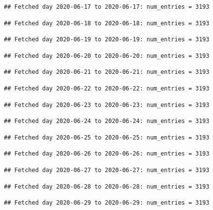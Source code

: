 \documentclass[]{article}
\begin{document}
\begin{verbatim}
## Fetched day 2020-06-17 to 2020-06-17: num_entries = 3193
\end{verbatim}

\begin{verbatim}
## Fetched day 2020-06-18 to 2020-06-18: num_entries = 3193
\end{verbatim}

\begin{verbatim}
## Fetched day 2020-06-19 to 2020-06-19: num_entries = 3193
\end{verbatim}

\begin{verbatim}
## Fetched day 2020-06-20 to 2020-06-20: num_entries = 3193
\end{verbatim}

\begin{verbatim}
## Fetched day 2020-06-21 to 2020-06-21: num_entries = 3193
\end{verbatim}

\begin{verbatim}
## Fetched day 2020-06-22 to 2020-06-22: num_entries = 3193
\end{verbatim}

\begin{verbatim}
## Fetched day 2020-06-23 to 2020-06-23: num_entries = 3193
\end{verbatim}

\begin{verbatim}
## Fetched day 2020-06-24 to 2020-06-24: num_entries = 3193
\end{verbatim}

\begin{verbatim}
## Fetched day 2020-06-25 to 2020-06-25: num_entries = 3193
\end{verbatim}

\begin{verbatim}
## Fetched day 2020-06-26 to 2020-06-26: num_entries = 3193
\end{verbatim}

\begin{verbatim}
## Fetched day 2020-06-27 to 2020-06-27: num_entries = 3193
\end{verbatim}

\begin{verbatim}
## Fetched day 2020-06-28 to 2020-06-28: num_entries = 3193
\end{verbatim}

\begin{verbatim}
## Fetched day 2020-06-29 to 2020-06-29: num_entries = 3193
\end{verbatim}
\end{document}
